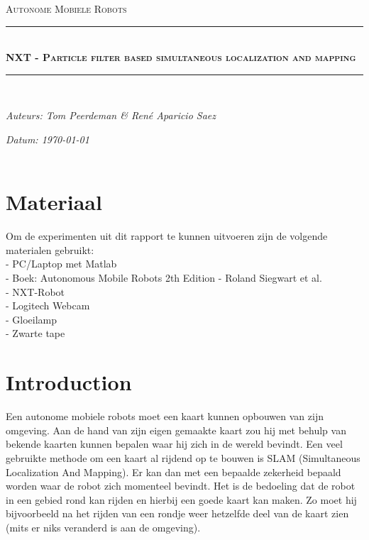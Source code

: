\documentclass[a4paper]{article}
\newcommand{\HRule}{\rule{\linewidth}{0.5mm}}
\begin{document}
\begin{titlepage}
\begin{center}
\textsc{\Large Autonome Mobiele Robots}\\[0.5cm]
\HRule \\[0,4cm]
\textsc{\huge \bfseries NXT - Particle filter based simultaneous localization and mapping}
\HRule \\[8cm]
\begin{minipage}{0.4\textwidth}
\begin{flushleft}\large
\emph{Auteurs: Tom Peerdeman \& Ren\'e Aparicio Saez}\\
\end{flushleft}
\end{minipage}
\begin{minipage}{0.4\textwidth}
\begin{flushright}\large
\emph{Datum: \today\\\hspace{1cm}}\\
\end{flushright}
\end{minipage}
\end{center}
\end{titlepage}

\tableofcontents
\newpage

\section{Materiaal}
Om de experimenten uit dit rapport te kunnen uitvoeren zijn de volgende materialen gebruikt:\\
- PC/Laptop met Matlab\\
- Boek: Autonomous Mobile Robots 2th Edition - Roland Siegwart et al.\\
- NXT-Robot\\
- Logitech Webcam\\
- Gloeilamp\\
- Zwarte tape

\section{Introduction}
Een autonome mobiele robots moet een kaart kunnen opbouwen van zijn omgeving. Aan de hand van zijn eigen gemaakte kaart zou hij met behulp van bekende kaarten kunnen bepalen waar hij zich in de wereld bevindt. Een veel gebruikte methode om een kaart al rijdend op te bouwen is SLAM (Simultaneous Localization And Mapping). Er kan dan met een bepaalde zekerheid bepaald worden waar de robot zich momenteel bevindt. Het is de bedoeling dat de robot in een gebied rond kan rijden en hierbij een goede kaart kan maken. Zo moet hij bijvoorbeeld na het rijden van een rondje weer hetzelfde deel van de kaart zien (mits er niks veranderd is aan de omgeving).
\end{document}
